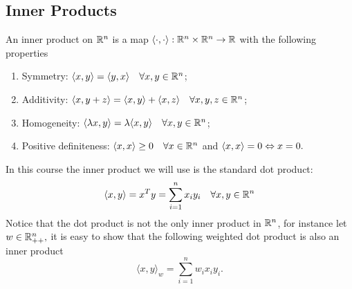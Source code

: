 \documentclass[10pt,a4paper]{article}
\begin{document}
\subsection{Inner Products}
\begin{definition} An inner product on $\mathbb{R}^n$ is a map $\langle \cdot, \cdot \rangle: \mathbb{R}^n \times \mathbb{R}^n \to \mathbb{R}$
	with the following properties
	\begin{enumerate}
\item Symmetry: $\langle x, y \rangle = \langle y, x \rangle \quad \forall x, y \in \mathbb{R}^n$;
\item Additivity: $\langle x, y+z \rangle = \langle x, y \rangle + \langle x, z \rangle  \quad \forall x, y,z \in \mathbb{R}^n$;
\item Homogeneity: $\langle \lambda x, y \rangle = \lambda \langle x, y \rangle\quad \forall x, y \in \mathbb{R}^n$;
\item Positive definiteness: $\langle x, x \rangle \geq 0 \quad \forall x \in \mathbb{R}^n$ and $\langle x, x \rangle = 0 \Leftrightarrow x =0.$
	\end{enumerate}
\end{definition}
In this course the inner product we will use is the standard dot product:
\begin{equation*}
	\langle x, y \rangle = x^T y = \sum_{i=1}^{n}x_i y_i \quad \forall x,y\in \mathbb{R}^n
\end{equation*}
Notice that the dot product is not the only inner product in $\mathbb{R}^n$, for instance let $w\in \mathbb{R}^n_{++},$ it is easy to show that the following weighted dot product is also an inner product
\begin{equation*}
\langle x, y\rangle_w = \sum_{i=1}^{n}w_i x_i y_i.
\end{equation*}
\end{document}
